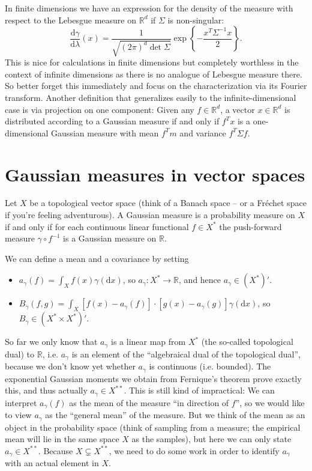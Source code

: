 \documentclass{scrartcl}
\theoremstyle{definition}
\theoremstyle{remark}
\newcommand{\de}{\mathrm d}
\newcommand{\Frechet}{Fr\'echet }
\newcommand{\R}{\mathbb R}
\begin{document}
In finite dimensions we have an expression for the density of the measure with respect to the Lebesgue measure on $\R^d$ if $\Sigma$ is non-singular:
\[ \frac{\de \gamma}{\de\lambda}(x) = \frac{1}{\sqrt{(2\pi)^d \det \Sigma}}\exp\left\{- \frac{x^T\Sigma^{-1}x}{2}\right\}. \]
This is nice for calculations in finite dimensions but completely worthless in the context of infinite dimensions as there is no analogue of Lebesgue measure there. So better forget this immediately and focus on the characterization via its Fourier transform. Another definition that generalizes easily to the infinite-dimensional case is via projection on one component: Given any $f\in\R^d$, a vector $x\in\R^d$ is distributed according to a Gaussian measure if and only if $f^T x$ is a one-dimensional Gaussian measure with mean $f^Tm$ and variance $f^T\Sigma f$.
\section{Gaussian measures in vector spaces}\label{sec:GaussBanach}
Let $X$ be a topological vector space (think of a Banach space -- or a \Frechet space if you're feeling adventurous). A Gaussian measure is a probability measure on $X$ if and only if for each continuous linear functional $f\in X^*$ the push-forward measure $\gamma \circ f^{-1}$ is a Gaussian measure on $\R$.

We can define a mean and a covariance by setting
\begin{itemize}
\item $a_\gamma(f) = \int_X f(x)\gamma(\de x)$, so $a_\gamma: X^*\to \R$, and hence $a_\gamma \in (X^*)'$.
\item $B_\gamma(f, g) = \int_X [f(x) - a_\gamma(f)]\cdot [g(x)-a_\gamma(g)]\gamma(\de x)$, so $B_\gamma \in (X^*\times X^*)'$.
\end{itemize}
So far we only know that $a_\gamma$ is a linear map from $X^*$ (the so-called topological dual) to $\R$, i.e. $a_\gamma$ is an element of the ``algebraical dual of the topological dual'', because we don't know yet whether $a_\gamma$ is continuous (i.e. bounded). The exponential Gaussian moments we obtain from Fernique's theorem prove exactly this, and thus actually $a_\gamma \in X^{**}$. This is still kind of impractical: We can interpret $a_\gamma(f)$ as the mean of the measure ``in direction of $f$'', so we would like to view $a_\gamma$ as the ``general mean'' of the measure. But we think of the mean as an object in the probability space (think of sampling from a measure; the empirical mean will lie in the same space $X$ as the samples), but here we can only state $a_\gamma \in X^{**}$. Because $X \subsetneq X^{**}$, we need to do some work in order to identify $a_\gamma$ with an actual element in $X$. 
\end{document}
